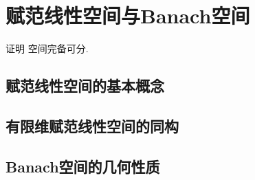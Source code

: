 \section{\deng 赋范线性空间与Banach空间}


证明 空间完备可分.

\subsection{\zhen 赋范线性空间的基本概念}

\subsection{\zhen 有限维赋范线性空间的同构}

\subsection{\zhen Banach空间的几何性质}
